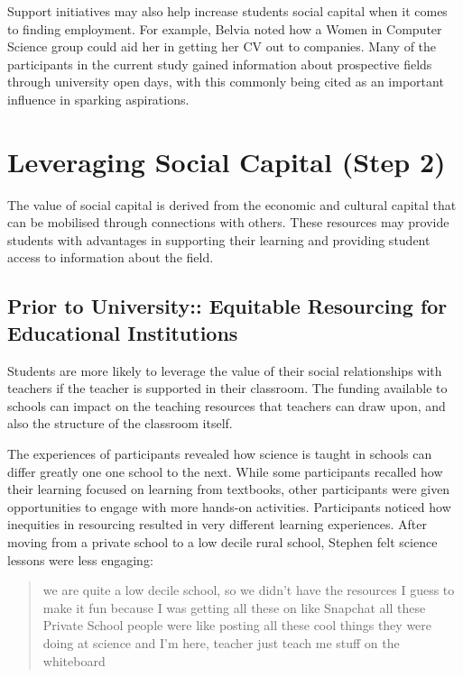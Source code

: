 Support initiatives may also help increase students social capital when it comes to finding employment. For example, Belvia noted how a Women in Computer Science group could aid her in getting her CV out to companies. Many of the participants in the current study gained information about prospective fields through university open days, with this commonly being cited as an important influence in sparking aspirations. 





\section{Leveraging Social Capital (Step 2)}
The value of social capital is derived from the economic and cultural capital that can be mobilised through connections with others. These resources may provide students with advantages in supporting their learning and providing student access to information about the field. 

\subsection{Prior to University:: Equitable Resourcing for Educational Institutions}

Students are more likely to leverage the value of their social relationships with teachers if the teacher is supported in their classroom. The funding available to schools can impact on the teaching resources that teachers can draw upon, and also the structure of the classroom itself. 

The experiences of participants revealed how science is taught in schools can differ greatly one one school to the next. While some participants recalled how their learning focused on learning from textbooks, other participants were given opportunities to engage with more hands-on activities. Participants noticed how inequities in resourcing resulted in very different learning experiences. After moving from a private school to a low decile rural school, Stephen felt science lessons were less engaging: \blockquote{we are quite a low decile school, so we didn't have the resources I guess to make it fun because I was getting all these on like Snapchat all these Private School people were like posting all these cool things they were doing at science and I'm here, teacher just teach me stuff on the whiteboard}.  


